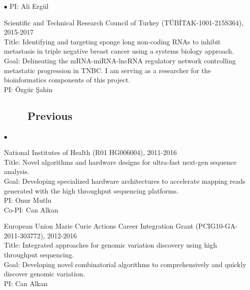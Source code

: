 \documentclass[margin,line]{res}
\newenvironment{list2}{
  \begin{list}{$\bullet$}{%
      \setlength{\itemsep}{0in}
      \setlength{\parsep}{0in} \setlength{\parskip}{0in}
      \setlength{\topsep}{0in} \setlength{\partopsep}{0in} 
      \setlength{\leftmargin}{0.2in}}}{\end{list}}
\begin{document}
\begin{resume}
\begin{list2}
                                         PI: Ali Ergül
                                       \item
                                         Scientific and Technical Research Council of Turkey (T\"{U}B\.{I}TAK-1001-215S364), 2015-2017\\
                                         Title: Identifying and targeting sponge long non-coding RNAs to inhibit metastasis in triple negative breast cancer
                                         using a systems biology approach.\\
                                         Goal: Delineating the mRNA-miRNA-lncRNA regulatory network controlling metastatic progression in TNBC. I am serving as a researcher 
                                         for the bioinformatics components of this project.\\
                                         PI: Özgür Şahin

                                       \end{list2}
               

\vspace{-0.5cm}
                                       \subsection{\small \sc ~~~~Previous}
                                       \begin{list2}
                                       \item
                                         National Institutes of Health (R01 HG006004), 2011-2016\\
                                         Title: Novel algorithms and hardware designs for ultra-fast next-gen sequence analysis.\\
                                         Goal: Developing specialized hardware architectures to accelerate mapping reads generated with the high throughput sequencing platforms.\\
                                         PI: Onur Mutlu\\
                                         Co-PI: Can Alkan
                                         \clearpage
                                       \item
                                         European Union Marie Curie Actions Career Integration Grant (PCIG10-GA-2011-303772),  2012-2016\\
                                         Title: Integrated approaches for genomic variation discovery using high throughput sequencing.\\
                                         Goal: Developing novel combinatorial algorithms to comprehensively and quickly discover genomic variation.\\
                                         PI: Can Alkan


\end{list2}
\end{resume}
\end{document}
